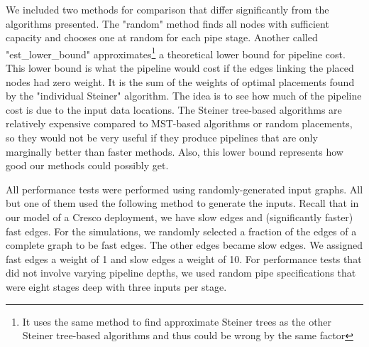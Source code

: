 \documentclass{acmart}
\begin{document}
	We included two methods for comparison that differ significantly from the algorithms presented. The "random" method finds all nodes with sufficient capacity and chooses one at random for each pipe stage. Another called "est\_lower\_bound" approximates\footnote{It uses the same method to find approximate Steiner trees as the other Steiner tree-based algorithms and thus could be wrong by the same factor} a theoretical lower bound for pipeline cost. This lower bound is what the pipeline would cost if the edges linking the placed nodes had zero weight. It is the sum of the weights of optimal placements found by the "individual Steiner" algorithm. The idea is to see how much of the pipeline cost is due to the input data locations. The Steiner tree-based algorithms are relatively expensive compared to MST-based algorithms or random placements, so they would not be very useful if they produce pipelines that are only marginally better than faster methods. Also, this lower bound represents how good our methods could possibly get. 
	
	All performance tests were performed using randomly-generated input graphs. All but one of them used the following method to generate the inputs. Recall that in our model of a Cresco deployment, we have slow edges and (significantly faster) fast edges. For the simulations, we randomly selected a fraction of the edges of a complete graph to be fast edges. The other edges became slow edges. We assigned fast edges a weight of 1 and slow edges a weight of 10. For performance tests that did not involve varying pipeline depths, we used random pipe specifications that were eight stages deep with three inputs per stage.
	
\end{document}
